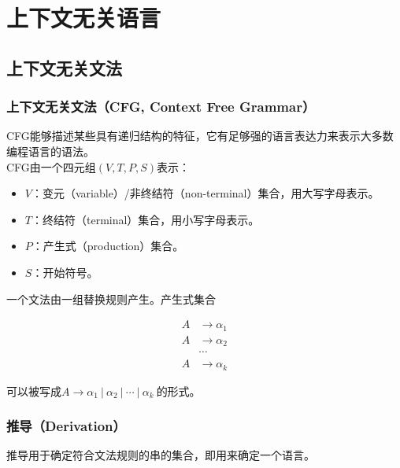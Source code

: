 \chapter{上下文无关语言}

\section{上下文无关文法}

\subsection{上下文无关文法（CFG, Context Free Grammar）}

CFG能够描述某些具有递归结构的特征，它有足够强的语言表达力来表示大多数编程语言的语法。\\

CFG由一个四元组$ (V, T, P, S) $表示：

\begin{itemize}
    \item $ V $：变元（variable）/非终结符（non-terminal）集合，用大写字母表示。
    \item $ T $：终结符（terminal）集合，用小写字母表示。
    \item $ P $：产生式（production）集合。
    \item $ S $：开始符号。
\end{itemize}

\vspace{0.5cm}

一个文法由一组替换规则产生。产生式集合

\vspace{-1cm}

\begin{align*}
    A & \rightarrow \alpha_1 \\
    A & \rightarrow \alpha_2 \\
      & \cdots               \\
    A & \rightarrow \alpha_k
\end{align*}

可以被写成$ A \rightarrow \alpha_1\ |\ \alpha_2\ |\ \cdots\ |\ \alpha_k\ $的形式。\\

\subsection{推导（Derivation）}

推导用于确定符合文法规则的串的集合，即用来确定一个语言。\\

